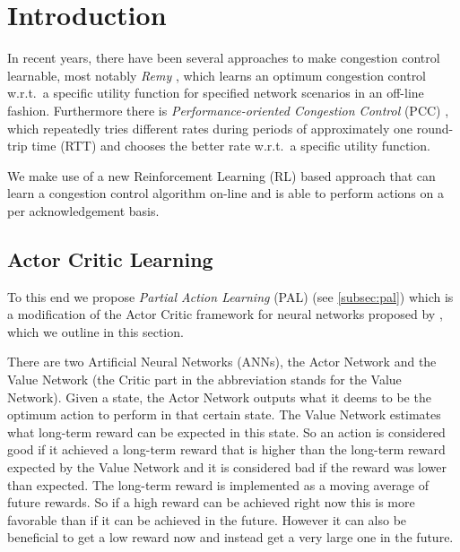 \documentclass[sigconf]{acmart}
\begin{document}




\maketitle%

\section{Introduction}

In recent years, there have been several approaches to make congestion control learnable, most notably \textit{Remy} \citep{winstein_tcp_2013}, which learns an optimum congestion control w.r.t.~a specific utility function for specified network scenarios in an off-line fashion. Furthermore there is \textit{Performance-oriented Congestion Control} (PCC) \citep{dong_pcc:_2015}, which repeatedly tries different rates during periods of approximately one round-trip time (RTT) and chooses the better rate w.r.t.~a specific utility function. 

We make use of a new Reinforcement Learning (RL) based approach that can learn a congestion control algorithm on-line and is able to perform actions on a per acknowledgement basis. 

\subsection{Actor Critic Learning}
\label{subsec:ac}

To this end we propose \textit{Partial Action Learning} (PAL) (see \ref{subsec:pal}) which is a modification of the Actor Critic framework for neural networks proposed by \citet{mnih_asynchronous_2016}, which we outline in this section. 

There are two Artificial Neural Networks (ANNs), the Actor Network and the Value Network (the Critic part in the abbreviation stands for the Value Network). Given a state, the Actor Network outputs what it deems to be the optimum action to perform in that certain state. The Value Network estimates what long-term reward can be expected in this state. So an action is considered good if it achieved a long-term reward that is higher than the long-term reward expected by the Value Network and it is considered bad if the reward was lower than expected. The long-term reward is implemented as a moving average of future rewards. So if a high reward can be achieved right now this is more favorable than if it can be achieved in the future. However it can also be beneficial to get a low reward now and instead get a very large one in the future. 
\end{document}

